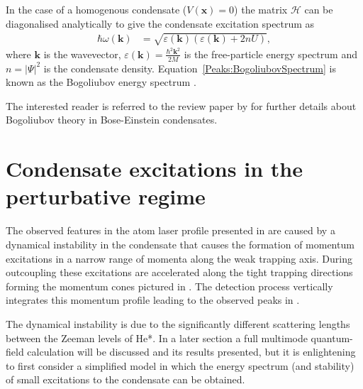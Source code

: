 In the case of a homogenous condensate ($V(\bm{x}) = 0$) the matrix $\mathcal{H}$ can be diagonalised analytically to give the condensate excitation spectrum as
\begin{align}
    \hbar \omega(\bm{k}) &= \sqrt{\varepsilon(\bm{k})\left(\varepsilon(\bm{k}) + 2 n U \right)},
    \label{Peaks:BogoliubovSpectrum}
\end{align}
where $\bm{k}$ is the wavevector, $\displaystyle \varepsilon(\bm{k}) = \frac{\hbar^2 \bm{k}^2}{2 M}$ is the free-particle energy spectrum and $n = \big|\Psi \big|^2$ is the condensate density. Equation~\eqref{Peaks:BogoliubovSpectrum} is known as the Bogoliubov energy spectrum \citep{Bogoliubov:1947}.

The interested reader is referred to the review paper by \citet{Ozeri:2005} for further details about Bogoliubov theory in Bose-Einstein condensates.

\section{Condensate excitations in the perturbative regime}
\label{Peaks:PerturbativeApproach}

The observed features in the atom laser profile presented in  are caused by a dynamical instability in the condensate that causes the formation of momentum excitations in a narrow range of momenta along the weak trapping axis. During outcoupling these excitations are accelerated along the tight trapping directions forming the momentum cones pictured in . The detection process vertically integrates this momentum profile leading to the observed peaks in .

The dynamical instability is due to the significantly different scattering lengths between the Zeeman levels of He*. In a later section a full multimode quantum-field calculation will be discussed and its results presented, but it is enlightening to first consider a simplified model in which the energy spectrum (and stability) of small excitations to the condensate can be obtained.

